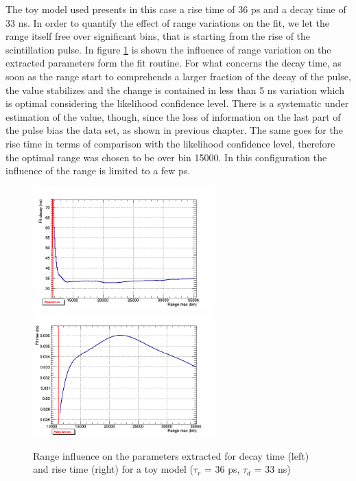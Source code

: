 The toy model used presents in this case a rise time of 36 ps and a decay time of 33 ns. 
In order to quantify the effect of range variations on the fit, we let the range itself free over significant bins, that is starting from the rise of the scintillation pulse.
In figure \ref{fig:range} is shown the influence of range variation on the extracted parameters form the fit routine.
For what concerns the decay time, as soon as the range start to comprehends a larger fraction of the decay of the pulse, the value stabilizes and the change is contained in less than 5 ns variation which is optimal considering the likelihood confidence level. There is a systematic under estimation of the value, though, since the loss of information on the last part of the pulse bias the data set, as shown in previous chapter.
The same goes for the rise time in terms of comparison with the likelihood confidence level, therefore the optimal range was chosen to be over bin 15000. In this configuration the influence of the range is limited to a few ps.
\begin{figure}[htbp]
\begin{center}
\includegraphics[width=7cm]{../Pictures/Chapter_7/decay_range_2.png}
\includegraphics[width=7cm]{../Pictures/Chapter_7/rise_range_2.png}
\end{center}
\caption[Range influence on toy model parameters]{Range influence on the parameters extracted for decay time (left) and rise time (right) for a toy model ($\tau _{r}$ = 36 ps, $\tau _{d}$ = 33 ns)}
\label{fig:range}
\end{figure}

